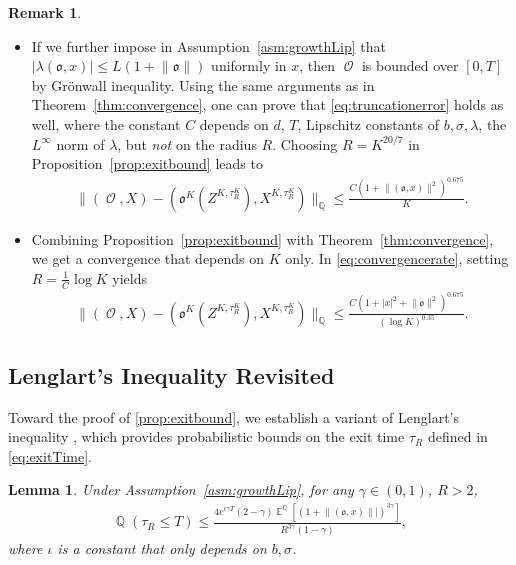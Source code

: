 \documentclass[11pt]{article}
\numberwithin{equation}{section}
\theoremstyle{plain}
\newtheorem{lemma}{Lemma}[section]
\theoremstyle{definition}
\newtheorem{remark}{Remark}[section]
\DeclareMathOperator{\E}{\mathbb{E}}
\DeclareMathOperator{\Q}{\mathbb{Q}}
\DeclareMathOperator{\calO}{\mathcal{O}}
\def\mo{\mathfrak{o}}
\begin{document}
\begin{remark}\label{rmk:truncation}
\begin{itemize}
    \item[(i)]  If we further impose in  Assumption~\ref{asm:growthLip} that $|\lambda(\mo,x)| \leq L(1+\lVert \mo \rVert)$ uniformly in $x$, then $\calO$ is bounded over $[0,T]$ by Gr\"{o}nwall inequality. Using the same arguments as in Theorem~\ref{thm:convergence}, one can prove that \eqref{eq:truncationerror} holds as well, 
where the constant $C$  depends on  $d$,  $T$, Lipschitz constants  of $b,\sigma, \lambda$, the $L^{\infty}$ norm of $\lambda$, but \emph{not} on the radius $R$. Choosing $R=K^{20/7}$ in Proposition~\ref{prop:exitbound} leads to 
\begin{align*}
    \lVert (\calO,X)-( \mo^K(Z^{K,\tau^K_R}) ,X^{K,\tau^K_R}) \rVert_{\Q} \leq \frac{C (1+\lVert(\mo,x) \rVert^2)^{0.675}}{K}. 
\end{align*}
\item[(ii)] Combining Proposition~\ref{prop:exitbound} with  Theorem~\ref{thm:convergence}, we get a convergence that depends on $K$ only. In \eqref{eq:convergencerate}, setting $R=\frac{1}{C} \log K$ yields 
\begin{align*}
    \lVert (\calO,X)-( \mo^K(Z^{K,\tau^K_R}) ,X^{K,\tau^K_R}) \rVert_{\Q} \leq \frac{C (1+|x|^2+\lVert \mo \rVert^2)^{0.675}}{(\log K)^{0.35}}. 
\end{align*}

\end{itemize}
\end{remark}


\subsection{Lenglart's Inequality Revisited}\label{sec:Lenglart} 

Toward the proof of \cref{prop:exitbound},  we establish a variant of Lenglart's inequality \cite{Lenglart1977}, which   provides probabilistic bounds on  the exit time $\tau_R$ defined in \eqref{eq:exitTime}. 

\begin{lemma}\label{lem:stopP}
  Under Assumption~\ref{asm:growthLip}, for any $\gamma \in (0,1)$, $R>2$,
    \begin{align}\label{eq:lenglart}
       \Q( \tau_R \leq T)  \leq \frac{ 4 e^{\iota \gamma T} (2-\gamma) \E^{\Q}[(1+\lVert(\mo ,x)\rVert|)^{3\gamma}]}{R^{3 \gamma}(1-\gamma) },
    \end{align}
    where $\iota$ is a constant that only depends on $b,\sigma$. 
\end{lemma}
\end{document}
